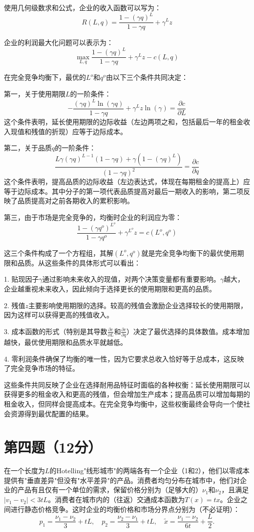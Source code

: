 \documentclass[12pt]{article}
\begin{document}
使用几何级数求和公式，企业的收入函数可以写为：
\[R(L,q)=\frac{1-(\gamma q)^L}{1-\gamma q}+\gamma^Lz\]

企业的利润最大化问题可以表示为：
\[\max_{L,q} \frac{1-(\gamma q)^L}{1-\gamma q}+\gamma^Lz-c(L,q)\]

在完全竞争均衡下，最优的$L^o$和$q^o$由以下三个条件共同决定：

第一，关于使用期限$L$的一阶条件：
\[-\frac{(\gamma q)^L\ln(\gamma q)}{1-\gamma q}+\gamma^Lz\ln(\gamma)=\frac{\partial c}{\partial L}\]
这个条件表明，延长使用期限的边际收益（左边两项之和，包括最后一年的租金收入现值和残值的折现）应等于边际成本。

第二，关于品质$q$的一阶条件：
\[\frac{L\gamma(\gamma q)^{L-1}(1-\gamma q)+\gamma(1-(\gamma q)^L)}{(1-\gamma q)^2}=\frac{\partial c}{\partial q}\]
这个条件表明，提高品质的边际收益（左边表达式，体现在每期租金的提高上）应等于边际成本。其中分子的第一项代表品质提高对最后一期收入的影响，第二项反映了品质提高对之前各期收入的累积影响。

第三，由于市场是完全竞争的，均衡时企业的利润应为零：
\[\frac{1-(\gamma q^o)^{L^o}}{1-\gamma q^o}+\gamma^{L^o}z=c(L^o,q^o)\]

这三个条件构成了一个方程组，其解$(L^o,q^o)$就是完全竞争均衡下的最优使用期限和品质。从这些条件的具体形式可以看出：

1. 贴现因子$\gamma$通过影响未来收入的现值，对两个决策变量都有重要影响。$\gamma$越大，企业越重视未来收入，因此倾向于选择更长的使用期限和更高的品质。

2. 残值$z$主要影响使用期限的选择。较高的残值会激励企业选择较长的使用期限，因为这样可以获得更高的残值收入。

3. 成本函数的形式（特别是其导数$\frac{\partial c}{\partial L}$和$\frac{\partial c}{\partial q}$）决定了最优选择的具体数值。成本增加越快，最优使用期限和品质水平就越低。

4. 零利润条件确保了均衡的唯一性，因为它要求总收入恰好等于总成本，这反映了完全竞争市场的特征。

这些条件共同反映了企业在选择耐用品特征时面临的各种权衡：延长使用期限可以获得更多的租金收入和更高的残值，但会增加生产成本；提高品质可以增加每期的租金收入，但同样会提高成本。在完全竞争均衡中，这些权衡最终会导向一个使社会资源得到最优配置的结果。

\section*{第四题（12分）}
在一个长度为$L$的Hotelling"线形城市"的两端各有一个企业（1和2），他们以零成本提供有"垂直差异"但没有"水平差异"的产品。消费者均匀分布在城市中，他们对企业的产品有且仅有一个单位的需求，保留价格分别为（足够大的）$\nu_1$和$\nu_2$，且满足$|v_1-v_2|<3tL$。消费者在城市内的（往返）交通成本函数为$T(x)=tx$。企业之间进行静态价格竞争。这时企业的均衡价格和市场分界点分别为（不必证明）：
\[p_1=\frac{\nu_1-\nu_2}{3}+tL,\quad p_2=\frac{\nu_2-\nu_1}{3}+tL,\quad\tilde{x}=\frac{\nu_1-\nu_2}{6t}+\frac{L}{2}.\]
\end{document}
